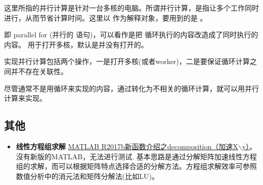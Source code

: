 这里所指的并行计算是针对一台多核的电脑。所谓并行计算，是指让多个工作同时进行，从而节省计算时间。这里以  作为解释对象，要用到的是 。\par

 即 parallel for (并行的  语句)，可以看作是把  循环执行的内容改造成了同时执行的内容。  用于打开多核，默认是并没有打开的。\par

实现并行计算包括两个操作，一是打开多核(或者worker)，二是要保证循环计算之间并不存在关联性。

\vspace{-0.8cm}


\vspace{-0.8cm}


尽管通常不是用循环来实现的内容，通过转化为不相关的循环计算，就可以用并行计算来实现。















\subsection{其他}

\begin{itemize}
    \item \textbf{线性方程组求解} \href{https://zhuanlan.zhihu.com/p/30958676}{MATLAB R2017b新函数介绍之decomposition（加速X$\backslash$y）}。沒有新版的MATLAB，无法进行测试. 基本思路是通过分解矩阵加速线性方程组的求解，而可以根据矩阵特点选择合适的分解方法。方程组求解效率可参照数值分析中的消元法和矩阵分解法(比如LU)。
\end{itemize}